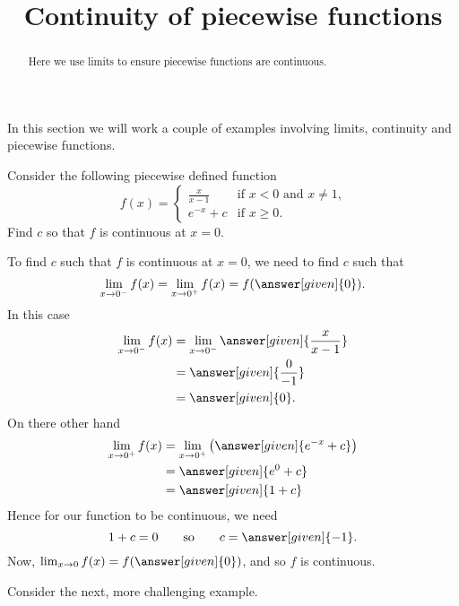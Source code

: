 \documentclass{ximera}
\title[Dig-In:]{Continuity of piecewise functions}
\begin{document}
\begin{abstract}
Here we use limits to ensure piecewise functions are continuous.
\end{abstract}
\maketitle

In this section we will work a couple of examples involving limits,
continuity and piecewise functions.

\begin{example}
Consider the following piecewise defined function
\[
f(x) = 
\begin{cases}
  \frac{x}{x-1} &\text{if $x<0$ and $x\ne 1$,}\\
  e^{-x} + c &\text{if $x\ge 0$}.
\end{cases}
\]
Find $c$ so that $f$ is continuous at $x=0$.
\begin{explanation}
  To find $c$ such that $f$ is continuous at $x=0$, we need to find
  $c$ such that
  \[
  \lim_{x\to 0^-} f(x) = \lim_{x\to 0^+}f(x) = f(\answer[given]{0}).
  \]
  In this case
  \begin{align*}
    \lim_{x\to 0^-} f(x) &= \lim_{x\to 0^-}\answer[given]{\frac{x}{x-1}}\\
    &= \answer[given]{\frac{0}{-1}}\\
    &=\answer[given]{0}.
  \end{align*}
  On there other hand
  \begin{align*}
    \lim_{x\to 0^+} f(x) &= \lim_{x\to 0^+}\left(\answer[given]{e^{-x}+c}\right)\\
    &= \answer[given]{e^0 + c}\\
    &= \answer[given]{1+ c}
  \end{align*}
  Hence for our function to be continuous, we need
  \[
  1 + c = 0\qquad\text{so}\qquad c = \answer[given]{-1}.
  \]
  Now, $\lim_{x\to 0} f(x) = f(\answer[given]{0})$, and so $f$ is continuous.
\end{explanation}
\end{example}


Consider the next, more challenging example.
\end{document}
